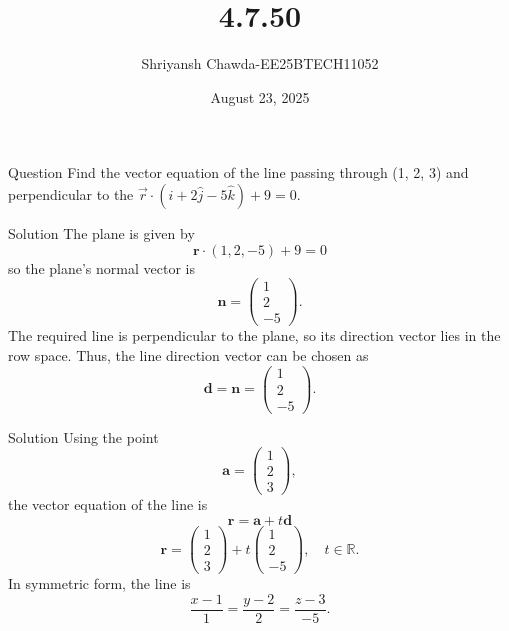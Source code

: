 \documentclass{beamer}
\title{4.7.50}
\author{Shriyansh Chawda-EE25BTECH11052}
\date{August 23, 2025}
\newcommand{\myvec}[1]{\ensuremath{\begin{pmatrix}#1\end{pmatrix}}}
\providecommand{\brak}[1]{\ensuremath{\left(#1\right)}}
\begin{document}
	

		\frame{\titlepage}
	
\begin{frame}{Question} 
	Find the vector equation of the line passing through (1, 2, 3) and perpendicular to the $\vec{r}\cdot(\hat{i} + 2\hat{j} - 5\hat{k}) + 9 = 0$.
	\end{frame}
	
\begin{frame}{Solution}
The plane is given by
\begin{equation}
	\mathbf r \cdot \brak{1, 2, -5} + 9 = 0
\end{equation}
so the plane's normal vector is
\begin{equation}
	\mathbf n = \myvec{1 \\ 2 \\ -5}.
\end{equation}
The required line is perpendicular to the plane, so its direction vector lies in the row space. Thus, the line direction vector can be chosen as
\begin{equation}
	\mathbf d = \mathbf n = \myvec{1 \\ 2 \\ -5}.
\end{equation}
\end{frame}

\begin{frame}{Solution}
Using the point
\begin{equation}
	\mathbf a = \myvec{1 \\ 2 \\ 3},
\end{equation}
the vector equation of the line is
\begin{equation}
	\mathbf r = \mathbf a + t\mathbf d
\end{equation}
\begin{equation}
	\mathbf r = \myvec{1 \\ 2 \\ 3} + t \myvec{1 \\ 2 \\ -5}, \quad t \in \mathbb R.
\end{equation}
In symmetric form, the line is
\begin{equation}
	\frac{x-1}{1} = \frac{y-2}{2} = \frac{z-3}{-5}.
\end{equation}
\end{frame}
\end{document}
